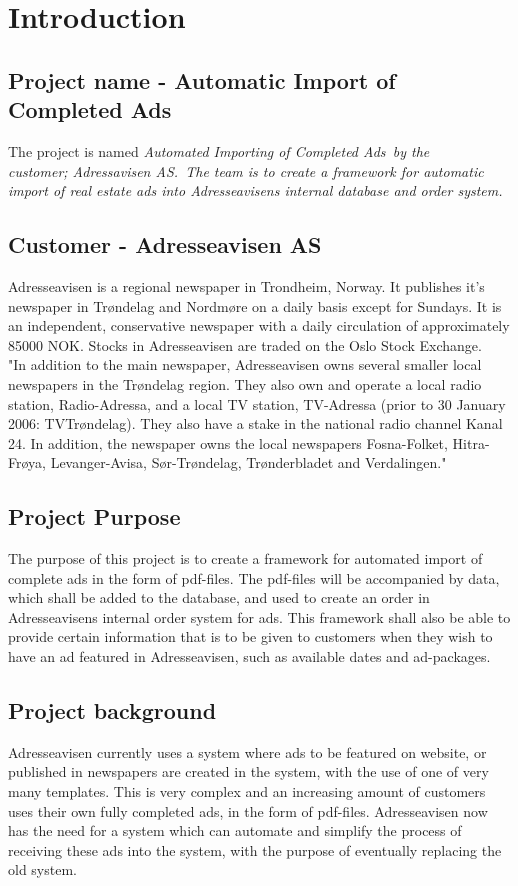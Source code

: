 \section{Introduction}
\subsection{Project name - Automatic Import of Completed Ads}
The project is named \em Automated Importing of Completed Ads\em \ by the \\
customer; \em Adressavisen AS.\em \ The team is to create a framework for automatic import of real estate ads
into Adresseavisens internal database and order system.
\subsection{Customer - Adresseavisen AS}
Adresseavisen is a regional newspaper in Trondheim, Norway. It publishes it's newspaper in Trøndelag and Nordmøre on a daily basis except for Sundays. It is an independent, conservative newspaper with a daily circulation of approximately 85000 NOK. 
Stocks in Adresseavisen are traded on the Oslo Stock Exchange.\\
"In addition to the main newspaper, Adresseavisen owns several smaller local newspapers in the Trøndelag region. They also own and operate a local radio station, Radio-Adressa, and a local TV station, TV-Adressa (prior to 30 January 2006: TVTrøndelag). They also have a stake in the national radio channel Kanal 24. In addition, the newspaper owns the local newspapers Fosna-Folket, Hitra-Frøya, Levanger-Avisa, Sør-Trøndelag, Trønderbladet and Verdalingen." \cite{adressaWiki}


\subsection{Project Purpose}
The purpose of this project is to create a framework for automated import of complete ads in the form of pdf-files. The pdf-files will be accompanied by data, which shall be added to the database, and used to create an order in Adresseavisens internal order system for ads. This framework shall also be able to provide certain information that is to be given to customers when they wish to have an ad featured in Adresseavisen, such as available dates and ad-packages.


\subsection{Project background}
Adresseavisen currently uses a system where ads to be featured on website, or published in newspapers are created in the system, with the use of one of very many templates. This is very complex and an increasing amount of customers uses their own fully completed ads, in the form of pdf-files. 
Adresseavisen now has the need for a system which can automate and simplify the process of receiving these ads into the system, with the purpose of eventually replacing the old system.

